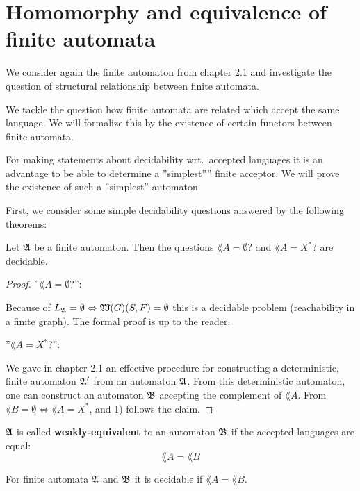 \section{Homomorphy and equivalence of finite automata}

We consider again the finite automaton from chapter 2.1 and investigate the
question of structural relationship between finite automata.

We tackle the question how finite automata are related which accept the same
language. We will formalize this by the existence of certain functors between
finite automata.

For making statements about decidability wrt.\ accepted languages it is an
advantage to be able to determine a ''simplest'''' finite acceptor. We will
prove the existence of such a ''simplest'' automaton.

First, we consider some simple decidability questions answered by the following
theorems:

\begin{theorem}
Let $\mbox{$\mathfrak{A}$}$ be a finite automaton. Then the questions $\lang{A} = \emptyset?$
and $\lang{A} = X^*?$ are decidable.
\end{theorem}

\begin{proof}
''$\lang{A} = \emptyset$?'':

Because of $\mbox{$L_{\mathfrak{A}}$} = \emptyset \Leftrightarrow \mbox{$\mathfrak{W}({G})$}(S, F) =
\emptyset$ this is a decidable problem (reachability in a finite graph). The
formal proof is up to the reader.

''$\lang{A} = X^*$?'':

We gave in chapter 2.1 an effective procedure for constructing a deterministic,
finite automaton $\mbox{$\mathfrak{A}$}'$ from an automaton $\mbox{$\mathfrak{A}$}$. From this deterministic
automaton, one can construct an automaton $\mbox{$\mathfrak{B}$}$ accepting the complement of
$\lang{A}$. From $\lang{B} = \emptyset \Leftrightarrow \lang{A} = X^*$,
and 1) follows the claim.
\end{proof}

\begin{definition}
$\mbox{$\mathfrak{A}$}$ is called {\bf weakly-equivalent} to an automaton $\mbox{$\mathfrak{B}$}$ if the
accepted languages are equal: \[ \lang{A} = \lang{B} \]
\end{definition}

\begin{theorem}
For finite automata $\mbox{$\mathfrak{A}$}$ and $\mbox{$\mathfrak{B}$}$ it is decidable if $\lang{A} =
\lang{B}$.
\end{theorem}


